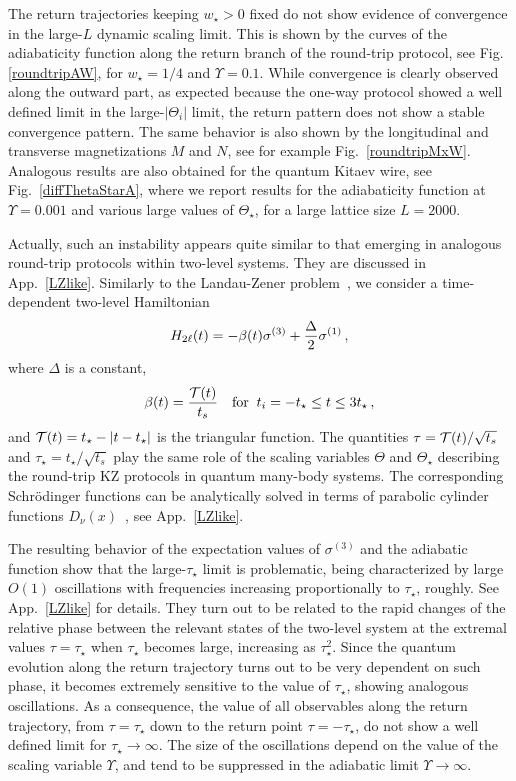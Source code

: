 The return trajectories keeping $w_\star>0$ fixed do not show evidence
of convergence in the large-$L$ dynamic scaling limit.  This is shown
by the curves of the adiabaticity function along the return branch of
the round-trip protocol, see Fig.\ref{roundtripAW}, for $w_\star=1/4$
and $\Upsilon=0.1$.  While convergence is clearly observed along the
outward part, as expected because the one-way protocol showed a well
defined limit in the large-$|\Theta_i|$ limit, the return pattern does
not show a stable convergence pattern. The same behavior is also shown
by the longitudinal and transverse magnetizations $M$ and $N$, see for
example Fig.~\ref{roundtripMxW}.  Analogous results are also obtained
for the quantum Kitaev wire, see Fig.~\ref{diffThetaStarA}, where we
report results for the adiabaticity function at $\Upsilon=0.001$ and
various large values of $\Theta_\star$, for a large lattice size
$L=2000$.

Actually, such an instability appears quite similar to that emerging
in analogous round-trip protocols within two-level systems.  They are
discussed in App.~\ref{LZlike}. Similarly to the 
Landau-Zener problem~\cite{LZeff}, we consider a time-dependent two-level
Hamiltonian
\begin{equation}
  H_{2\ell}(t) = - \beta(t) \sigma^{(3)}
  + {\Delta\over 2} \sigma^{(1)}\,,
\label{hrdef2}
\end{equation}
where $\Delta$ is a constant, 
\begin{eqnarray}
  \beta(t) = {{\cal T}(t)\over t_s}\quad
       {\rm for}\;\; t_i=-t_\star \le t \le 3t_\star\,,
\label{betadef}
\end{eqnarray}
and $ {\cal T}(t) = t_\star - |t-t_\star|$ is the triangular
function. The quantities $\tau={\cal T}(t)/\sqrt{t_s}$ and
$\tau_\star=t_\star/\sqrt{t_s}$ play the same role of the scaling
variables $\Theta$ and $\Theta_\star$ describing the round-trip KZ
protocols in quantum many-body systems. The corresponding
Schr\"odinger functions can be analytically solved in terms 
of parabolic cylinder functions $D_\nu(x)$~\cite{VG-96}, see
App.~\ref{LZlike}.

The resulting behavior of the expectation values of $\sigma^{(3)}$ and
the adiabatic function show that the large-$\tau_\star$ limit is
problematic, being characterized by large $O(1)$ oscillations with
frequencies increasing proportionally to $\tau_\star$, roughly. See
App.~\ref{LZlike} for details.  They turn out to be related to the
rapid changes of the relative phase between the relevant states of the
two-level system at the extremal values $\tau=\tau_\star$ when
$\tau_\star$ becomes large, increasing as $\tau_\star^2$. Since the
quantum evolution along the return trajectory turns out to be very
dependent on such phase, it becomes extremely sensitive to the value
of $\tau_\star$, showing analogous oscillations. As a consequence, the
value of all observables along the return trajectory, from
$\tau=\tau_\star$ down to the return point $\tau = - \tau_\star$, do
not show a well defined limit for $\tau_\star\to\infty$.  The size of
the oscillations depend on the value of the scaling variable
$\Upsilon$, and tend to be suppressed in the adiabatic limit
$\Upsilon\to\infty$.

